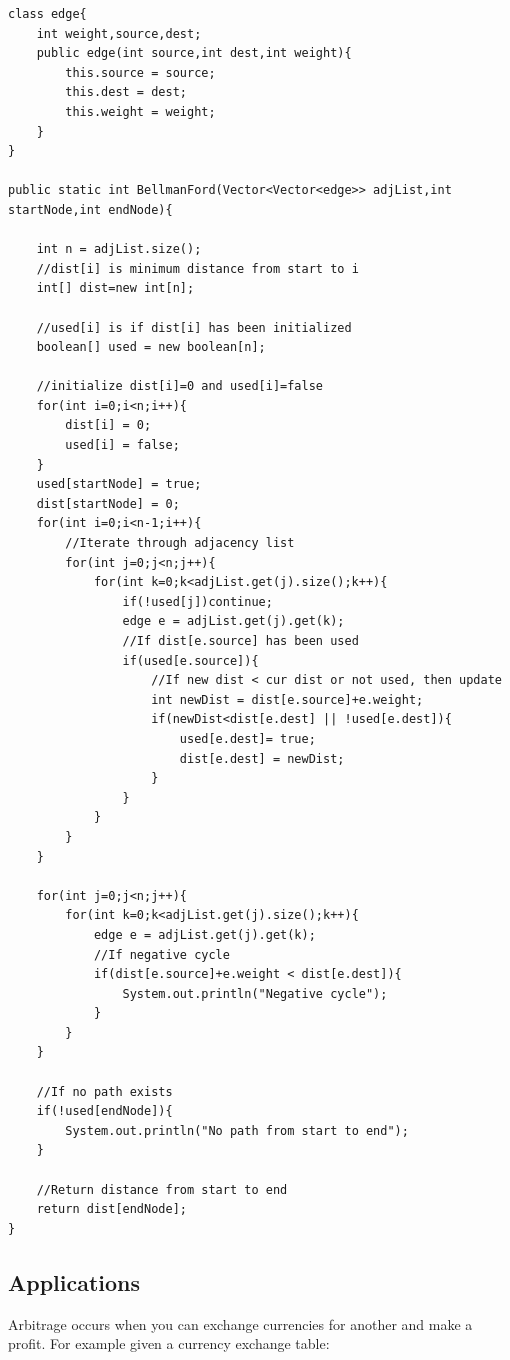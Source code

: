 \documentclass[11pt,oneside]{book}
\begin{document}
\begin{lstlisting}
class edge{
    int weight,source,dest;
    public edge(int source,int dest,int weight){
        this.source = source;
        this.dest = dest;
        this.weight = weight;
    }
}

public static int BellmanFord(Vector<Vector<edge>> adjList,int startNode,int endNode){
    
    int n = adjList.size();
    //dist[i] is minimum distance from start to i
    int[] dist=new int[n];
    
    //used[i] is if dist[i] has been initialized
    boolean[] used = new boolean[n];
    
    //initialize dist[i]=0 and used[i]=false
    for(int i=0;i<n;i++){
        dist[i] = 0;
        used[i] = false;
    }
    used[startNode] = true;
    dist[startNode] = 0;
    for(int i=0;i<n-1;i++){
        //Iterate through adjacency list
        for(int j=0;j<n;j++){
            for(int k=0;k<adjList.get(j).size();k++){
                if(!used[j])continue;
                edge e = adjList.get(j).get(k);
                //If dist[e.source] has been used
                if(used[e.source]){
                    //If new dist < cur dist or not used, then update
                    int newDist = dist[e.source]+e.weight;
                    if(newDist<dist[e.dest] || !used[e.dest]){
                        used[e.dest]= true; 
                        dist[e.dest] = newDist;
                    }
                }
            }
        }
    }
    
    for(int j=0;j<n;j++){
        for(int k=0;k<adjList.get(j).size();k++){
            edge e = adjList.get(j).get(k);
            //If negative cycle
            if(dist[e.source]+e.weight < dist[e.dest]){
                System.out.println("Negative cycle");
            }
        }
    }
    
    //If no path exists
    if(!used[endNode]){
        System.out.println("No path from start to end");
    }
    
    //Return distance from start to end
    return dist[endNode];
}

\end{lstlisting}

\subsection{Applications}

Arbitrage occurs when you can exchange currencies for another and make a profit. For example given a currency exchange table:
\end{document}
